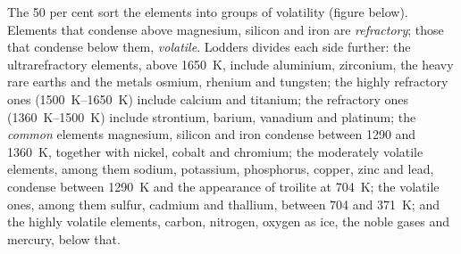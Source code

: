 The 50 per cent  sort the elements into groups of
volatility (figure below). Elements that condense above magnesium, silicon and
iron are \emph{refractory}; those that condense below them, \emph{volatile}.
Lodders divides each side further: the ultrarefractory elements, above
\qty{1650}{K}, include aluminium, zirconium, the heavy rare earths and the
metals osmium, rhenium and tungsten; the highly refractory ones
(\qtyrange{1500}{1650}{K}) include calcium and titanium; the refractory ones
(\qtyrange{1360}{1500}{K}) include strontium, barium, vanadium and platinum; the
\emph{common}
elements magnesium, silicon and iron condense between \num{1290} and
\qty{1360}{K}, together with nickel, cobalt and chromium; the moderately
volatile elements, among them sodium, potassium, phosphorus, copper, zinc and
lead, condense between \qty{1290}{K} and the appearance of troilite at
\qty{704}{K}; the volatile ones, among them sulfur, cadmium and thallium,
between \num{704} and \qty{371}{K}; and the highly volatile elements, carbon,
nitrogen, oxygen as ice, the noble gases and mercury, below that.

